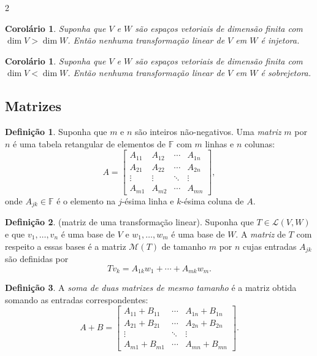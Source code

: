 \documentclass{article}
\theoremstyle{plain}
\newtheorem{cor}[thm]{Corolário}
\theoremstyle{definition}
\newtheorem{defn}{Definição}[section]
\theoremstyle{remark}
\begin{document}
\begin{multicols}{2}
\begin{cor}
    Suponha que \(V\) e \(W\) são espaços vetoriais de dimensão finita com \(\dim V > \dim W\). Então nenhuma transformação linear de \(V\) em \(W\) é injetora.
\end{cor}

\begin{cor}
    Suponha que \(V\) e \(W\) são espaços vetoriais de dimensão finita com \(\dim V < \dim W\). Então nenhuma transformação linear de \(V\) em \(W\) é sobrejetora.
\end{cor}

\subsection{Matrizes}
\begin{defn}
    Suponha que \(m\) e \(n\) são inteiros não-negativos. Uma \emph{matriz} \(m\) por \(n\) é uma tabela retangular de elementos de \(\mathbb{F}\) com \(m\) linhas e \(n\) colunas:
    \[
        A = \begin{bmatrix}
            A_{11} & A_{12} & \cdots & A_{1n} \\
            A_{21} & A_{22} & \cdots & A_{2n} \\
            \vdots & \vdots & \ddots & \vdots \\
            A_{m1} & A_{m2} & \cdots & A_{mn}
        \end{bmatrix},
    \]
    \noindent onde \(A_{jk} \in \mathbb{F}\) é o elemento na \(j\)-ésima linha e \(k\)-ésima coluna de \(A\).
\end{defn}

\begin{defn} (matriz de uma transformação linear).
    Suponha que \(T \in \mathcal{L}(V, W)\) e que \(v_1, \ldots, v_n\) é uma base de \(V\) e \(w_1, \ldots, w_m\) é uma base de \(W\). A \emph{matriz} de \(T\) com respeito a essas bases é a matriz \(\mathcal{M}(T)\) de tamanho \(m\) por \(n\) cujas entradas \(A_{jk}\) são definidas por
    \[
        Tv_k = A_{1k} w_1 + \cdots + A_{mk} w_m.
    \]    
\end{defn}

\begin{defn}
    A \emph{soma de duas matrizes de mesmo tamanho} é a matriz obtida somando as entradas correspondentes:
    \[
        A + B = \begin{bmatrix}
            A_{11} + B_{11} & \cdots & A_{1n} + B_{1n} \\
            A_{21} + B_{21} & \cdots & A_{2n} + B_{2n} \\
            \vdots & \ddots & \vdots \\
            A_{m1} + B_{m1} & \cdots & A_{mn} + B_{mn}
        \end{bmatrix}.
    \]
\end{defn}


\end{multicols}
\end{document}
